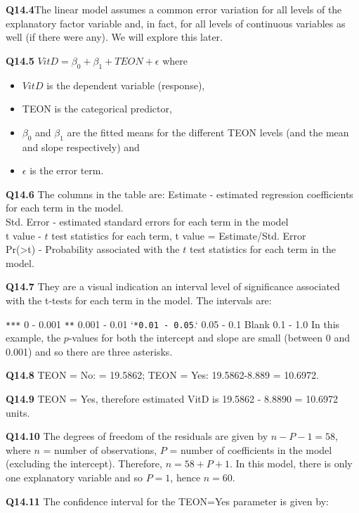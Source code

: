 \documentclass[
  oneside]{krantz}
\providecommand{\tightlist}{%
  \setlength{\itemsep}{0pt}\setlength{\parskip}{0pt}}
\begin{document}
\textbf{Q14.4}The linear model assumes a common error variation for all levels of the explanatory factor variable and, in fact, for all levels of continuous variables as well (if there were any). We will explore this later.

\textbf{Q14.5} \(VitD =\beta_0+\beta_1+TEON +\epsilon\)
where

\begin{itemize}
\tightlist
\item
  \(VitD\) is the dependent variable (response),
\item
  TEON is the categorical predictor,
\item
  \(\beta_0\) and \(\beta_1\) are the fitted means for the different TEON levels (and the mean and slope respectively) and
\item
  \(\epsilon\) is the error term.
\end{itemize}

\textbf{Q14.6} The columns in the table are:
Estimate - estimated regression coefficients for each term in the model.\\
Std. Error - estimated standard errors for each term in the model\\
t value - \(t\) test statistics for each term, t value = Estimate/Std. Error\\
Pr(\textgreater\textbar t\textbar) - Probability associated with the \(t\) test statistics for each term in the model.

\textbf{Q14.7} They are a visual indication an interval level of significance associated with the t-tests for each term in the model. The intervals are:

\texttt{***} 0 - 0.001
\texttt{**} 0.001 - 0.01
`\texttt{*0.01\ -\ 0.05}.` 0.05 - 0.1
Blank 0.1 - 1.0
In this example, the \(p\)-values for both the intercept and slope are small (between 0 and 0.001) and so there are three asterisks.

\textbf{Q14.8} TEON = No: = 19.5862; TEON = Yes: 19.5862-8.889 = 10.6972.

\textbf{Q14.9} TEON = Yes, therefore estimated VitD is 19.5862 - 8.8890
= 10.6972 units.

\textbf{Q14.10} The degrees of freedom of the residuals are given by \(n - P - 1 = 58\), where \(n\) = number of observations, \(P\) = number of coefficients in the model (excluding the intercept). Therefore, \(n = 58 + P + 1\). In this model, there is only one explanatory variable and so \(P = 1\), hence \(n = 60\).

\textbf{Q14.11} The confidence interval for the TEON=Yes parameter is given by:
\end{document}
